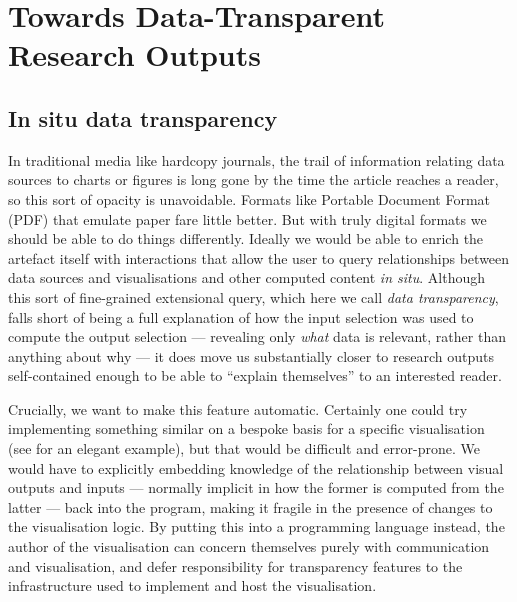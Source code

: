 \section{Towards Data-Transparent Research Outputs}
\label{sec:example}

\subsection{In situ data transparency}

In traditional media like hardcopy journals, the trail of information relating data sources to charts or
figures is long gone by the time the article reaches a reader, so this sort of opacity is unavoidable. Formats
like Portable Document Format (PDF) that emulate paper fare little better. But with truly digital formats we
should be able to do things differently. Ideally we would be able to enrich the artefact itself with
interactions that allow the user to query relationships between data sources and visualisations and other
computed content \emph{in situ}.  Although this sort of fine-grained extensional query, which here we call \emph{data
transparency}, falls short of being a full explanation of how the input selection was used to compute the
output selection --- revealing only \emph{what} data is relevant, rather than anything about why --- it does
move us substantially closer to research outputs self-contained enough to be able to ``explain themselves'' to
an interested reader.

Crucially, we want to make this feature automatic. Certainly one could try implementing something similar on a
bespoke basis for a specific visualisation (see \citet{bremer15} for an elegant example), but that would be
difficult and error-prone. We would have to explicitly embedding knowledge of the relationship between visual
outputs and inputs --- normally implicit in how the former is computed from the latter --- back into the
program, making it fragile in the presence of changes to the visualisation logic. By putting this into a
programming language instead, the author of the visualisation can concern themselves purely with communication
and visualisation, and defer responsibility for transparency features to the infrastructure used to implement
and host the visualisation.


